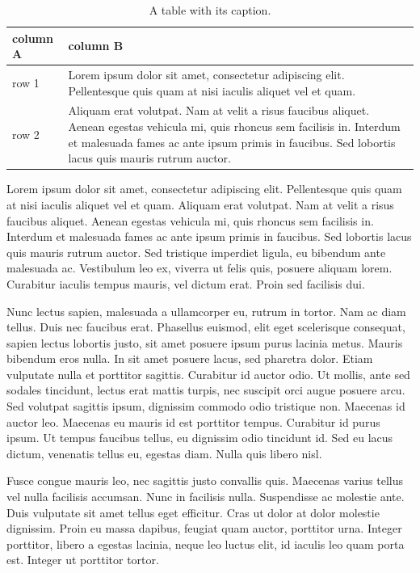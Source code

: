 \documentclass{UoYCSproject}
\begin{document}
\begin{table}[htb]
\caption{ A table with its caption.}
\begin{center}
\begin{tabular}{|p{}|p{}|}
  \hline
  column A & column B \\\hline
  row 1 &
          Lorem ipsum dolor sit amet, consectetur adipiscing elit. Pellentesque quis quam at nisi iaculis aliquet vel et quam. \\\hline
  row 2 &
          Aliquam erat volutpat. Nam at velit a risus faucibus
          aliquet. Aenean egestas vehicula mi, quis rhoncus sem
          facilisis in. Interdum et malesuada fames ac ante ipsum
          primis in faucibus. Sed lobortis lacus quis mauris rutrum
          auctor. \\\hline
\end{tabular}
\end{center}
\end{table}

Lorem ipsum dolor sit amet, consectetur adipiscing elit. Pellentesque
quis quam at nisi iaculis aliquet vel et quam. Aliquam erat
volutpat. Nam at velit a risus faucibus aliquet. Aenean egestas
vehicula mi, quis rhoncus sem facilisis in. Interdum et malesuada
fames ac ante ipsum primis in faucibus. Sed lobortis lacus quis mauris
rutrum auctor. Sed tristique imperdiet ligula, eu bibendum ante
malesuada ac. Vestibulum leo ex, viverra ut felis quis, posuere
aliquam lorem. Curabitur iaculis tempus mauris, vel dictum erat. Proin
sed facilisis dui.

Nunc lectus sapien, malesuada a ullamcorper eu, rutrum in tortor. Nam
ac diam tellus. Duis nec faucibus erat. Phasellus euismod, elit eget
scelerisque consequat, sapien lectus lobortis justo, sit amet posuere
ipsum purus lacinia metus. Mauris bibendum eros nulla. In sit amet
posuere lacus, sed pharetra dolor. Etiam vulputate nulla et porttitor
sagittis. Curabitur id auctor odio. Ut mollis, ante sed sodales
tincidunt, lectus erat mattis turpis, nec suscipit orci augue posuere
arcu. Sed volutpat sagittis ipsum, dignissim commodo odio tristique
non. Maecenas id auctor leo. Maecenas eu mauris id est porttitor
tempus. Curabitur id purus ipsum. Ut tempus faucibus tellus, eu
dignissim odio tincidunt id. Sed eu lacus dictum, venenatis tellus eu,
egestas diam. Nulla quis libero nisl.

Fusce congue mauris leo, nec sagittis justo convallis quis. Maecenas
varius tellus vel nulla facilisis accumsan. Nunc in facilisis
nulla. Suspendisse ac molestie ante. Duis vulputate sit amet tellus
eget efficitur. Cras ut dolor at dolor molestie dignissim. Proin eu
massa dapibus, feugiat quam auctor, porttitor urna. Integer porttitor,
libero a egestas lacinia, neque leo luctus elit, id iaculis leo quam
porta est. Integer ut porttitor tortor.
\end{document}
